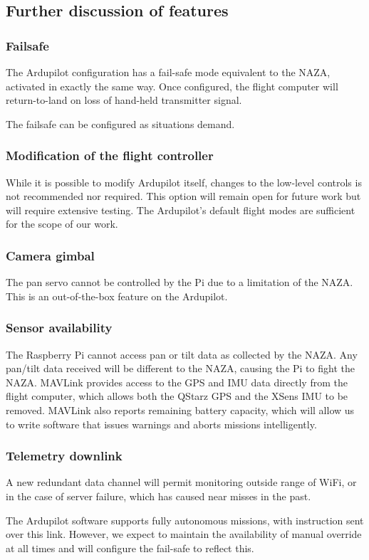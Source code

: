 \documentclass[a4paper, 11pt, titlepage]{article}
\begin{document}
\subsection{Further discussion of features}
\subsubsection{Failsafe}
The Ardupilot configuration has a fail-safe mode equivalent to the NAZA, activated in exactly the same way.  Once configured, the flight computer will return-to-land on loss of hand-held transmitter signal.

The failsafe can be configured as situations demand.
\subsubsection{Modification of the flight controller}
While it is possible to modify Ardupilot itself, changes to the low-level controls is not recommended nor required. This option will remain open for future work but will require extensive testing. The Ardupilot’s default flight modes are sufficient for the scope of our work.
\subsubsection{Camera gimbal}
The pan servo cannot be controlled by the Pi due to a limitation of the NAZA. 
This is an out-of-the-box feature on the Ardupilot. 
\subsubsection{Sensor availability}
The Raspberry Pi cannot access  pan or tilt data as collected by the NAZA. Any  pan/tilt data received will be different to the NAZA, causing the Pi to fight the NAZA.
MAVLink provides access to the GPS and IMU data directly from the flight computer, which allows both the QStarz GPS and the XSens IMU to be removed. 
MAVLink also reports remaining battery capacity, which will allow us to write software that issues warnings and aborts missions intelligently.
\subsubsection{Telemetry downlink}
A new redundant data channel will permit monitoring outside range of WiFi, or in the case of server failure, which has caused near misses in the past.

The Ardupilot software supports fully autonomous missions, with instruction sent over this link. However, we expect to maintain the availability of manual override at all times and will configure the fail-safe to reflect this.
\end{document}
